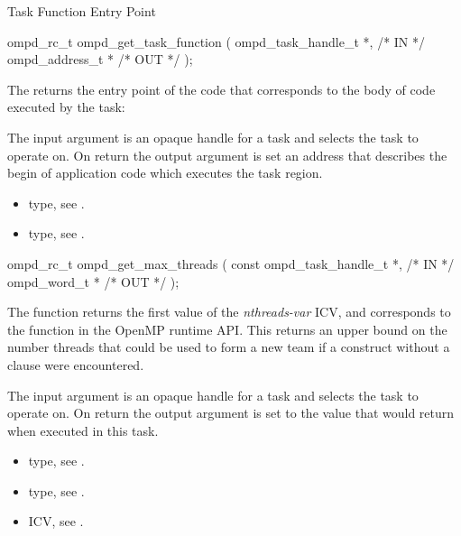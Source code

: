\summary
Task Function Entry Point
\format
\cspecificstart
\begin{boxedcode}
ompd\_rc\_t ompd\_get\_task\_function (
  ompd\_task\_handle\_t *,                                 /* IN */
  ompd\_address\_t *                                 /* OUT */
);
\end{boxedcode}
\cspecificend

\descr
The  returns the entry point of the code
that corresponds to the body of code executed by the task:

\argdesc
The input argument  is an opaque handle for a task and selects the task to operate on.
On return the output argument  is set an address that describes the begin of application
code which executes the task region.

\crossreferences
\begin{itemize}
	\item {} type, see .
	\item {} type, see .
\end{itemize}


\summary

\format
\cspecificstart
\begin{boxedcode}
ompd\_rc\_t ompd\_get\_max\_threads (
  const ompd\_task\_handle\_t  *,                           /* IN */
  ompd\_word\_t              *                                   /* OUT */
); 
\end{boxedcode}
\cspecificend

\descr
The  function returns the first value of the
 \emph{nthreads-var} ICV,
and corresponds to the  function
in the OpenMP runtime API.
This returns an upper bound on the number threads that could be used
to form a new team if a  construct without a
 clause were encountered.

\argdesc
The input argument  is an opaque handle for a task and selects the task to operate on.
On return the output argument  is set to the value that  would return when
executed in this task.

\crossreferences
\begin{itemize}
	\item {} type, see .
	\item {} type, see .
	\item {} ICV, see .
\end{itemize}

